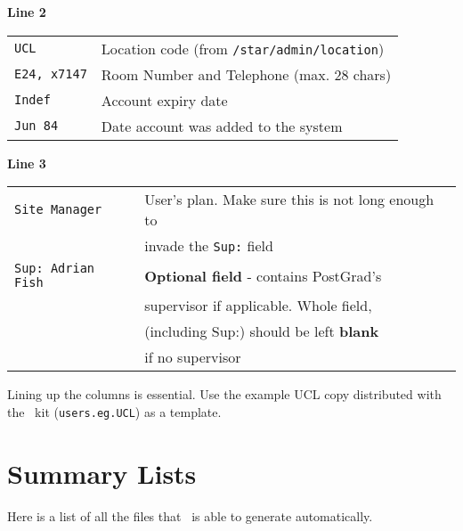 {\bf Line 2}

\begin{center}
\begin{tabular}{ll}
{\tt UCL}  & Location code (from {\tt /star/admin/location}) \\
{\tt E24, x7147} & Room Number and Telephone (max. 28 chars) \\
{\tt Indef}  &  Account expiry date \\
{\tt Jun 84}  & Date account was added to the system \\
\end{tabular}
\end{center}

{\bf Line 3}

\begin{center}
\begin{tabular}{ll}
{\tt Site Manager}  & User's plan. Make sure this is not long enough to \\
                    & invade the {\tt Sup:} field \\
{\tt Sup: Adrian Fish} & {\bf Optional field} - contains PostGrad's\\
                       & supervisor if applicable. Whole field, \\
                       & (including Sup:) should be left {\bf blank} \\
                       &  if no supervisor \\
\end{tabular}
\end{center}

Lining up the columns is essential. Use the example UCL copy distributed
with the \staradmin\ kit ({\tt users.eg.UCL}) as a template.

\section{Summary Lists}
\label{summarylists}

Here is a list of all the files that \staradmin\ is able to generate
automatically.

